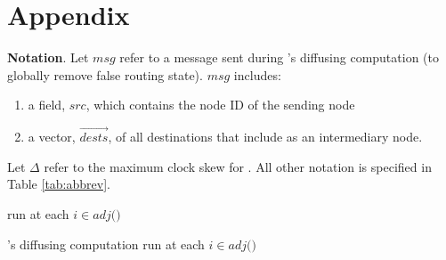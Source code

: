 \section{Appendix}
\label{sec:appendix}

{\bf Notation}. Let $msg$ refer to a message sent during \purges's diffusing computation (to globally remove false routing state). $msg$ includes:
\begin{enumerate}

	\item a field, $src$, which contains the node ID of the sending node 
	\item a vector, $\overrightarrow{dests}$, of all destinations that include \bad as an intermediary node. 

\end{enumerate}
Let $\Delta$ refer to the maximum clock skew for \cprs. All other notation is specified in Table \ref{tab:abbrev}.

\begin{algorithm}
\caption{\second  run at each $i \in adj($\bads$)$} 
\label{alg:second}

\begin{algorithmic}[1]

	\ENDIF
\ENDFOR
	\ENDIF

\end{algorithmic}
\end{algorithm}




\begin{algorithm}
\caption{\purges's diffusing computation run at each $i \in adj($\bads$)$}
\label{alg:purge}

\begin{algorithmic}[1]
		\STATE{\minvis$[d] \leftarrow \infty$}
	\ENDIF
\ENDFOR
	
\ENDIF

\end{algorithmic}
\end{algorithm}


